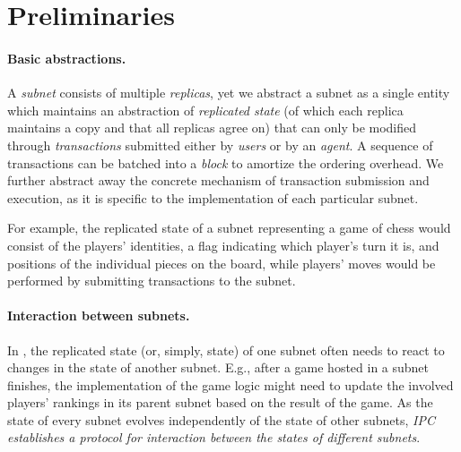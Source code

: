 \section{Preliminaries}
\label{sec:preliminaries}

\paragraph{Basic abstractions.}
A \emph{subnet} consists of multiple \emph{replicas}, yet we abstract a subnet as a single entity which maintains an  abstraction of \emph{replicated state} (of which each replica maintains a copy and that all replicas agree on)
that can only be modified through \emph{transactions} \gls{submit}ted either by \emph{\glspl{user}} or by an \emph{\gls{agent}}.
A sequence of transactions can be batched into a \emph{\gls{block}} to amortize the ordering overhead.
We further abstract away the concrete mechanism of transaction submission and execution, as it is specific to the implementation of each particular subnet.

For example, the replicated state of a subnet representing a game of chess would consist of the players' identities, a flag indicating which player's turn it is, and positions of the individual pieces on the board,
while players' moves would be performed by submitting transactions to the subnet.

\paragraph{Interaction between subnets.}
In \ipc, the replicated state (or, simply, state) of one subnet often needs to react to changes in the state of another subnet.
E.g., after a game hosted in a subnet finishes, the implementation of the game logic might need to update the involved players' rankings in its parent subnet based on the result of the game.
As the state of every subnet evolves independently of the state of other subnets,
\emph{IPC establishes a protocol for interaction between the states of different subnets}.

